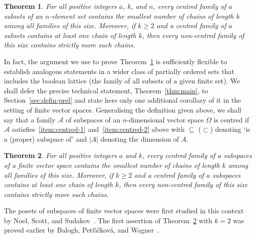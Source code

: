 \documentclass[11pt,a4paper,reqno]{amsart}
\newtheorem{thm}{Theorem}
\numberwithin{claim}{thm}
\theoremstyle{definition}
\newcommand{\cA}{\mathcal{A}}
\renewcommand{\ge}{\geqslant}
\begin{document}
\begin{thm}
  \label{thm:Kleitman}
  For all positive integers $a$, $k$, and $n$, every centred family of $a$ subsets of an $n$-element set contains the smallest number of chains of length $k$ among all families of this size. Moreover, if $k \ge 2$ and a centred family of $a$ subsets contains at least one chain of length $k$, then every non-centred family of this size contains strictly more such chains.
\end{thm}

In fact, the argument we use to prove Theorem~\ref{thm:Kleitman} is sufficiently flexible to establish analogous statements in a wider class of partially ordered sets that includes the boolean lattice (the family of all subsets of a given finite set). We shall defer the precise technical statement, Theorem~\ref{thm:main}, to Section~\ref{sec:defin-prel} and state here only one additional corollary of it in the setting of finite vector spaces. Generalising the definition given above, we shall say that a family $\cA$ of subspaces of an $n$-dimensional vector space $\Omega$ is centred if $\cA$ satisfies~\ref{item:centred-1} and~\ref{item:centred-2} above with $\subseteq$ ($\subset$) denoting `is a (proper) subspace of' and $|A|$ denoting the dimension of $A$.

\begin{thm}
  \label{thm:vector-spaces}
  For all positive integers $a$ and $k$, every centred family of $a$ subspaces of a finite vector space contains the smallest number of chains of length $k$ among all families of this size. Moreover, if $k \ge 2$ and a centred family of $a$ subspaces contains at least one chain of length $k$, then every non-centred family of this size contains strictly more such chains.
\end{thm}

The posets of subspaces of finite vector spaces were first studied in this context by Noel, Scott, and Sudakov~\cite{NoScSu}. The first assertion of Theorem~\ref{thm:vector-spaces} with $k=2$ was proved earlier by Balogh, Pet\v{r}\'{\i}\v{c}kov\'a, and Wagner~\cite{BaPeWa}.
\end{document}
